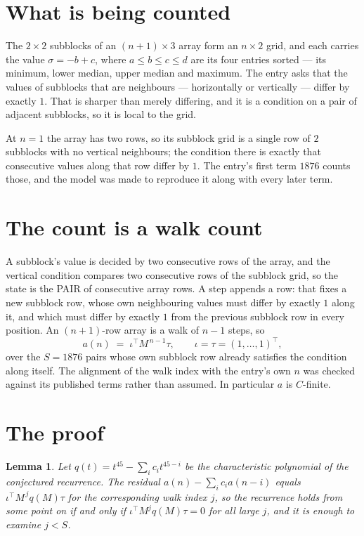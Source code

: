 \documentclass[11pt,a4paper]{article}
\theoremstyle{plain}
\newtheorem{lemma}[theorem]{Lemma}
\theoremstyle{definition}
\begin{document}
\section{What is being counted}

The $2\times2$ subblocks of an $(n+1)\times3$ array form an
$n\times2$ grid, and each carries the value $\sigma=-b+c$, where $a\le b\le c\le d$ are its four entries sorted --- its minimum, lower median, upper median and maximum. The entry asks that the values of
subblocks that are neighbours --- horizontally or vertically --- differ by exactly $1$.
That is sharper than merely differing, and it is a condition on a pair of adjacent subblocks,
so it is local to the grid.

At $n=1$ the array has two rows, so its subblock grid is a single row of $2$ subblocks with
no vertical neighbours; the condition there is exactly that consecutive values along that row
differ by $1$. The entry's first term $1876$ counts those, and the model was made to
reproduce it along with every later term.

\section{The count is a walk count}

A subblock's value is decided by two consecutive rows of the array, and the
vertical condition compares two consecutive rows of the subblock grid, so the state is the
PAIR of consecutive array rows. A step appends a row: that fixes a new subblock row, whose own
neighbouring values must differ by exactly $1$ along it, and which must differ by exactly
$1$ from the previous subblock row in every position. An $(n+1)$-row array is a walk of
$n-1$ steps, so
\[
a(n)\;=\;\iota^{\!\top}M^{\,n-1}\tau,\qquad\iota=\tau=(1,\dots,1)^{\!\top},
\]
over the $S=1876$ pairs whose own subblock row already satisfies the condition along itself.
The alignment of the walk index with the entry's own $n$ was checked against its published
terms rather than assumed. In particular $a$ is $C$-finite.

\section{The proof}

\begin{lemma}\label{lem:crit}
Let $q(t)=t^{45}-\sum_i c_it^{45-i}$ be the characteristic polynomial of the
conjectured recurrence. The residual $a(n)-\sum_ic_ia(n-i)$ equals
$\iota^{\!\top}M^{\,j}q(M)\tau$ for the corresponding walk index $j$, so the recurrence
holds from some point on if and only if $\iota^{\!\top}M^{j}q(M)\tau=0$ for all large $j$,
and it is enough to examine $j<S$.
\end{lemma}
\end{document}
